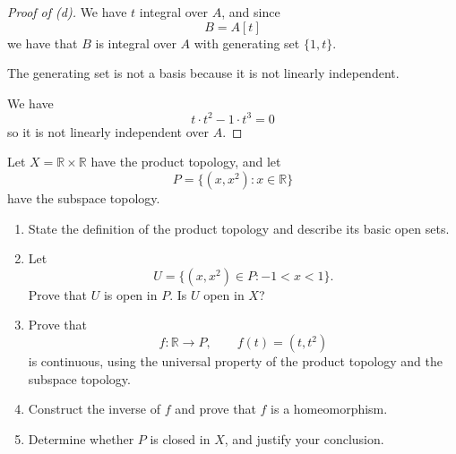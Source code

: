 \documentclass[11pt]{article}
\begin{document}
\begin{proof}[Proof of (d)]
    We have $t$ integral over $A$, and since 
    \[
        B = A[t] 
    \]
    we have that $B$ is integral over $A$ with 
    generating set $\{1,t\}$. 

    The generating set is not a basis because it is 
    not linearly independent. 

    We have 
    \[
        t\cdot t^2 - 1 \cdot t^3 = 0 
    \] 
    so it is not linearly independent over $A$. 
\end{proof}

\begin{prob*}
    Let \(X=\mathbb R\times\mathbb R\) have the
    product topology, and let
    \[
        P=\{(x,x^2):x\in\mathbb R\}
    \]
    have the subspace topology.

    \begin{enumerate}[label=\alph*)]
        \item State the definition of the product
        topology and describe its basic open sets.

        \item Let
        \[
            U=\{(x,x^2)\in P:-1<x<1\}.
        \]
        Prove that \(U\) is open in \(P\).
        Is \(U\) open in \(X\)?

        \item Prove that
        \[
            f:\mathbb R\to P,\qquad
            f(t)=(t,t^2)
        \]
        is continuous, using the universal
        property of the product topology and
        the subspace topology.

        \item Construct the inverse of \(f\)
        and prove that \(f\) is a homeomorphism.

        \item Determine whether \(P\) is closed
        in \(X\), and justify your conclusion.
    \end{enumerate}
\end{prob*}
\end{document}
